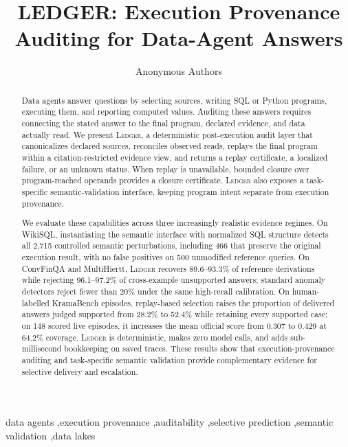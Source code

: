 \documentclass[5p,times]{elsarticle}
\newcommand{\ledger}{\textsc{Ledger}\xspace}
\begin{document}
\begin{frontmatter}

\title{LEDGER: Execution Provenance Auditing for Data-Agent Answers}

\author{Anonymous Authors}

\begin{abstract}
Data agents answer questions by selecting sources, writing SQL or Python
programs, executing them, and reporting computed values. Auditing these
answers requires connecting the stated answer to the final program, declared
evidence, and data actually read. We present \ledger, a deterministic
post-execution audit layer that canonicalizes declared sources, reconciles
observed reads, replays the final program within a citation-restricted evidence
view, and returns a replay certificate, a localized failure, or an unknown
status. When replay is unavailable, bounded closure over program-reached
operands provides a closure certificate. \ledger also exposes a task-specific
semantic-validation interface, keeping program intent separate from execution
provenance.

We evaluate these capabilities across three increasingly realistic evidence
regimes. On WikiSQL, instantiating the semantic interface with normalized SQL
structure detects all 2,715 controlled semantic perturbations, including 466
that preserve the original execution result, with no false positives on 500
unmodified reference queries. On ConvFinQA and MultiHiertt, \ledger recovers
89.6--93.3\% of reference derivations while rejecting 96.1--97.2\% of
cross-example unsupported answers; standard anomaly detectors reject fewer
than 20\% under the same high-recall calibration. On human-labelled
KramaBench episodes, replay-based selection raises the proportion of delivered
answers judged supported from 28.2\% to 52.4\% while retaining every supported
case; on 148 scored live episodes, it increases the mean official score from
0.307 to 0.429 at 64.2\% coverage. \ledger is deterministic, makes zero model
calls, and adds sub-millisecond bookkeeping on saved traces. These results
show that execution-provenance auditing and task-specific semantic validation
provide complementary evidence for selective delivery and escalation.
\end{abstract}

\begin{keyword}
data agents \sep execution provenance \sep auditability \sep selective prediction \sep semantic validation \sep data lakes
\end{keyword}

\end{frontmatter}
\end{document}
